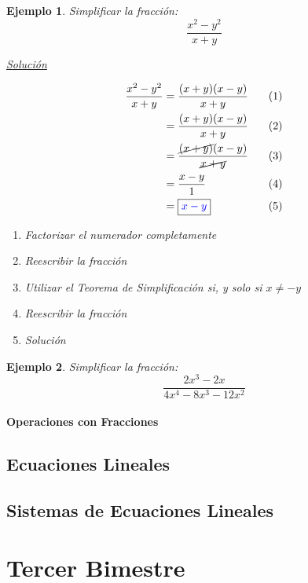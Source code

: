 \documentclass[letterpaper, 10pt, oneside]{book}
\newtheorem{example}{Ejemplo}[section]
\begin{document}
		\begin{example}
			Simplificar la fracción: $$\frac{x^2-y^2}{x+y}$$
			\vspace{1mm}
			
			\underline{Solución}
			
			\begin{align*}
				\frac{x^2-y^2}{x+y} & = \frac{(x+y)(x-y)}{x+y} & (1)\\
				&=\frac{(x+y)(x-y)}{x+y} \hspace{3mm} & (2)\\
				&=\frac{\cancel{(x+y)}(x-y)}{\cancel{x+y}} & (3)\\
				&=\frac{x-y}{1} \hspace{3mm} & (4)\\
				&= \fbox{\color{blue}{$x-y$}} & (5)
			\end{align*}
			
			\begin{enumerate}
				\item Factorizar el numerador completamente
				\item Reescribir la fracción
				\item Utilizar el Teorema de Simplificación si, y solo si $x\neq -y$
				\item Reescribir la fracción
				\item Solución
			\end{enumerate}
		\end{example}
	
		\begin{example}
			Simplificar la fracción: $$\frac{2x^3-2x}{4x^4-8x^3-12x^2}$$
		\end{example}
	\subsection{Operaciones con Fracciones}
	
	\chapter{Ecuaciones Lineales}
	
	\chapter{Sistemas de Ecuaciones Lineales}
	\part{Tercer Bimestre}
\end{document}
